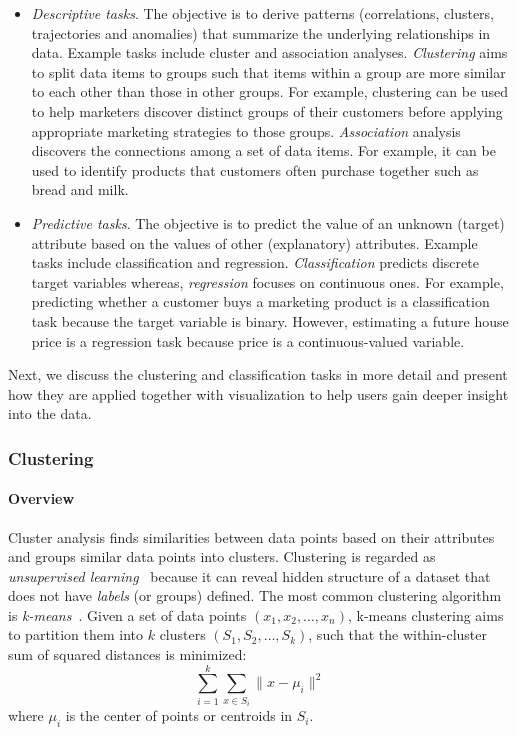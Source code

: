 \begin{itemize}
		\item \emph{Descriptive tasks}. The objective is to derive patterns (correlations, clusters, trajectories and anomalies) that summarize the underlying relationships in data. Example tasks include cluster and association analyses. \emph{Clustering} aims to split data items to groups such that items within a group are more similar to each other than those in other groups. For example, clustering can be used to help marketers discover distinct groups of their customers before applying appropriate marketing strategies to those groups. \emph{Association} analysis discovers the connections among a set of data items. For example, it can be used to identify products that customers often purchase together such as bread and milk.
		
		\item \emph{Predictive tasks}. The objective is to predict the value of an unknown (target) attribute based on the values of other (explanatory) attributes. Example tasks include classification and regression. \emph{Classification} predicts discrete target variables whereas, \emph{regression} focuses on continuous ones. For example, predicting whether a customer buys a marketing product is a classification task because the target variable is binary. However, estimating a future house price is a regression task because price is a continuous-valued variable.
\end{itemize}

Next, we discuss the clustering and classification tasks in more detail and present how they are applied together with visualization to help users gain deeper insight into the data.

\subsubsection{Clustering}

\paragraph{Overview}
Cluster analysis finds similarities between data points based on their attributes and groups similar data points into clusters. Clustering is regarded as \emph{unsupervised learning}~\cite{Han2011} because it can reveal hidden structure of a dataset that does not have \emph{labels} (or groups) defined. The most common clustering algorithm is \emph{k-means}~\cite{Lloyd1982}. Given a set of data points $(x_1, x_2, \dots, x_n)$, k-means clustering aims to partition them into $k$ clusters $(S_1, S_2, \dots, S_k)$, such that the within-cluster sum of squared distances is minimized: 
\[
\sum_{i=1}^k\sum_{x\in S_i} \lVert x-\mu_i \rVert^2
\]
where $\mu_i$ is the center of points or centroids in $S_i$. 

